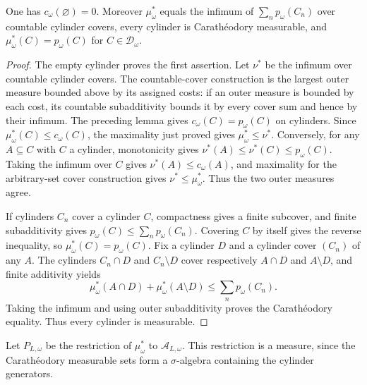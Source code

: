 \begin{lemma}\label{lem:cylinder-outer-measure}
\leanok
{}
One has $c_\omega(\varnothing)=0$. Moreover $\mu_\omega^*$ equals
the infimum of $\sum_n p_\omega(C_n)$ over countable cylinder covers,
every cylinder is Carath\'eodory measurable, and
$\mu_\omega^*(C)=p_\omega(C)$ for $C\in\mathcal D_\omega$.
\end{lemma}
\begin{proof}
The empty cylinder proves the first assertion. Let $\nu^*$ be the
infimum over countable cylinder covers. The countable-cover construction
is the largest outer measure bounded above by its assigned costs: if an
outer measure is bounded by each cost, its countable subadditivity
bounds it by every cover sum and hence by their infimum.
The preceding lemma gives $c_\omega(C)=p_\omega(C)$ on cylinders.
Since $\mu_\omega^*(C)\leq c_\omega(C)$, the maximality just proved
gives $\mu_\omega^*\leq\nu^*$. Conversely, for any $A\subseteq C$
with $C$ a cylinder, monotonicity gives
$\nu^*(A)\leq\nu^*(C)\leq p_\omega(C)$. Taking the infimum over
$C$ gives $\nu^*(A)\leq c_\omega(A)$, and maximality for the
arbitrary-set cover construction gives $\nu^*\leq\mu_\omega^*$.
Thus the two outer measures agree.

If cylinders $C_n$ cover a cylinder $C$, compactness gives a finite
subcover, and finite subadditivity gives
$p_\omega(C)\le\sum_n p_\omega(C_n)$. Covering $C$ by itself gives
the reverse inequality, so $\mu_\omega^*(C)=p_\omega(C)$.
Fix a cylinder $D$ and a cylinder cover $(C_n)$ of any $A$.
The cylinders $C_n\cap D$ and $C_n\setminus D$ cover respectively
$A\cap D$ and $A\setminus D$, and finite additivity yields
\[
 \mu_\omega^*(A\cap D)+\mu_\omega^*(A\setminus D)
 \le\sum_n p_\omega(C_n).
\]
Taking the infimum and using outer subadditivity proves the
Carath\'eodory equality. Thus every cylinder is measurable.
\end{proof}

\begin{definition}\label{def:algebraic-fibre-probability}
\leanok
{}
Let $P_{L,\omega}$ be the restriction of $\mu_\omega^*$ to
$\mathcal A_{L,\omega}$. This restriction is a measure, since the
Carath\'eodory measurable sets form a $\sigma$-algebra containing the
cylinder generators.
\end{definition}

